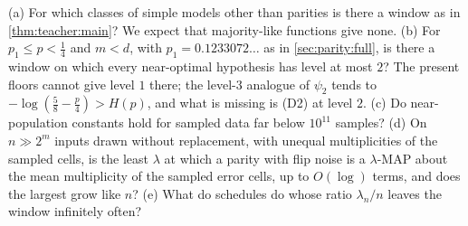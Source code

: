 \begin{question}\label{q:teacher:open}
(a) For which classes of simple models other than parities is there a window as in \cref{thm:teacher:main}? We expect that majority-like functions give none. (b) For $p_1\le p<\frac14$ and $m<d$, with $p_1=0.1233072\ldots$ as in \cref{sec:parity:full}, is there a window on which every near-optimal hypothesis has level at most $2$? The present floors cannot give level $1$ there; the level-$3$ analogue of $\psi_2$ tends to $-\log(\frac58-\frac p4)>H(p)$, and what is missing is (D2) at level $2$. (c) Do near-population constants hold for sampled data far below $10^{11}$ samples? (d) On $n\gg2^m$ inputs drawn without replacement, with unequal multiplicities of the sampled cells, is the least $\lambda$ at which a parity with flip noise is a $\lambda$-MAP about the mean multiplicity of the sampled error cells, up to $O(\log)$ terms, and does the largest grow like $n$? (e) What do schedules do whose ratio $\lambda_n/n$ leaves the window infinitely often?
\end{question}
